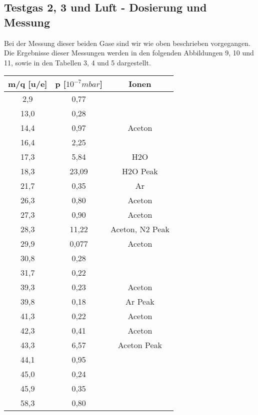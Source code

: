 \subsection{Testgas 2, 3 und Luft - Dosierung und Messung}
Bei der Messung dieser beiden Gase sind wir wie oben beschrieben vorgegangen. Die Ergebnisse dieser Messungen werden in den folgenden Abbildungen 9, 10 und 11, sowie in den Tabellen 3, 4 und 5 dargestellt.


\begin{center}
\begin{tabular}{c|c|c}
m/q [u/e] & p [$10^{-7} mbar$] & Ionen\\	
\hline	
2,9 &	0,77 &\\
13,0 &	0,28 &\\
14,4 &	0,97 & Aceton\\
16,4 &	2,25 &\\
17,3 &	5,84 & H2O\\
18,3 &	23,09 & H2O Peak\\
21,7 &	0,35 & Ar\\
26,3 &	0,80 & Aceton\\
27,3 &	0,90 & Aceton\\
28,3 &	11,22 & Aceton, N2 Peak\\
29,9 &	0,077 & Aceton\\
30,8 &	0,28 &\\
31,7 &	0,22 &\\
39,3 &	0,23 & Aceton\\
39,8 &	0,18 & Ar Peak\\
41,3 &	0,22 & Aceton\\
42,3 &	0,41 & Aceton\\
43,3 &	6,57 & Aceton Peak\\
44,1 &	0,95 &\\
45,0 &	0,24 &\\
45,9 &	0,35 &\\
58,3 &	0,80 &\\
\end{tabular}
\end{center}


